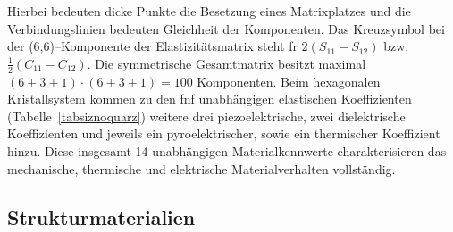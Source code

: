 Hierbei bedeuten dicke Punkte die Besetzung eines
Matrixplatzes und die Verbindungslinien bedeuten Gleichheit der
Komponenten.  Das Kreuzsymbol bei der (6,6)--Komponente der
Elastizitätsmatrix steht fr $2(S_{11} - S_{12})$ bzw.\
$ \frac{1}{2} (C_{11} - C_{12}) $. Die symmetrische Gesamtmatrix
besitzt maximal $ (6+3+1) \cdot (6+3+1) = 100 $ Komponenten.
Beim hexagonalen Kristallsystem kommen zu den fnf unabhängigen
elastischen Koeffizienten (Tabelle~\ref{tabsiznoquarz}) weitere drei
piezoelektrische, zwei dielektrische Koeffizienten und jeweils ein
pyroelektrischer, sowie ein thermischer Koeffizient hinzu. Diese
insgesamt 14 unabhängigen Materialkennwerte
charakterisieren das mechanische, thermische und elektrische
Materialverhalten vollständig.


\subsection{Strukturmaterialien}
\label{substratmaterialien}

